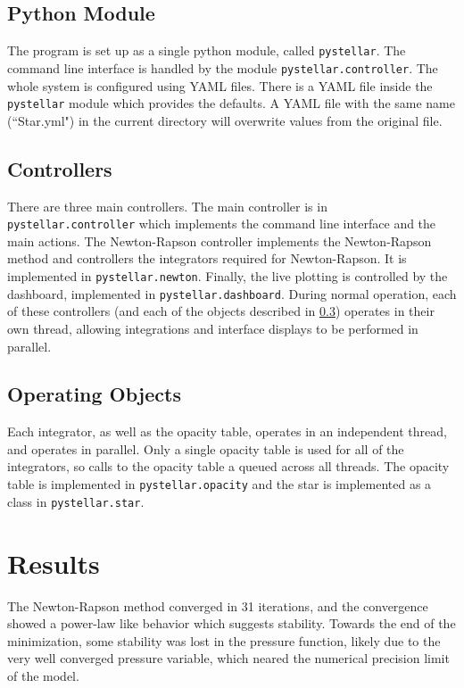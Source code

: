 \documentclass[10pt]{article}
\begin{document}
\subsection{Python Module}
The program is set up as a single python module, called \lstinline{pystellar}. The command line interface is handled by the module \lstinline{pystellar.controller}. The whole system is configured using YAML files. There is a YAML file inside the \lstinline{pystellar} module which provides the defaults. A YAML file with the same name (``Star.yml") in the current directory will overwrite values from the original file.

\subsection{Controllers}
There are three main controllers. The main controller is in \lstinline{pystellar.controller} which implements the command line interface and the main actions. The Newton-Rapson controller implements the Newton-Rapson method and controllers the integrators required for Newton-Rapson. It is implemented in \lstinline{pystellar.newton}. Finally, the live plotting is controlled by the dashboard, implemented in \lstinline{pystellar.dashboard}. During normal operation, each of these controllers (and each of the objects described in \cref{sec:objects}) operates in their own thread, allowing integrations and interface displays to be performed in parallel.

\subsection{Operating Objects} \label{sec:objects}
Each integrator, as well as the opacity table, operates in an independent thread, and operates in parallel. Only a single opacity table is used for all of the integrators, so calls to the opacity table a queued across all threads. The opacity table is implemented in \lstinline{pystellar.opacity} and the star is implemented as a class in \lstinline{pystellar.star}.

\section{Results} \label{sec:results}
The Newton-Rapson method converged in 31 iterations, and the convergence showed a power-law like behavior which suggests stability. Towards the end of the minimization, some stability was lost in the pressure function, likely due to the very well converged pressure variable, which neared the numerical precision limit of the model.
\end{document}
